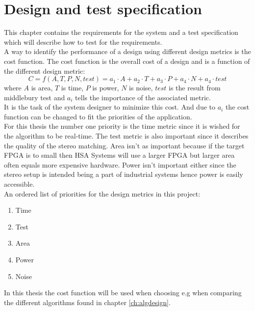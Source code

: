 \chapter{Design and test specification} \label{ch:req}
This chapter contains the requirements for the system and a test specification which will describe how to test for the requirements.\\

A way to identify the performance of a design using different design metrics is the cost function. The cost function is the overall cost of a design and is a function of the different design metric:
\begin{equation}
C = f(A,T,P,N,test) = a_1\cdot A + a_2 \cdot T + a_3 \cdot P + a_4 \cdot N + a_4 \cdot test
\end{equation}
where $A$ is area, $T$ is time, $P$ is power, $N$ is noise, $test$ is the result from middlebury test and $a_i$ tells the importance of the associated metric.\\
It is the task of the system designer to minimize this cost. And due to $a_i$ the cost function can be changed to fit the priorities of the application.\\

For this thesis the number one priority is the time metric since it is wished for the algorithm to be real-time. The test metric is also important since it describes the quality of the stereo matching. Area isn't as important because if the target FPGA is to small then HSA Systems will use a larger FPGA but larger area often equals more expensive hardware. Power isn't important either since the stereo setup is intended being a part of industrial systems hence power is easily accessible.\\
An ordered list of priorities for the design metrics in this project:
\begin{enumerate}
  \item Time
  \item Test
  \item Area
  \item Power
  \item Noise
\end{enumerate}

In this thesis the cost function will be used when choosing e.g when comparing the different algorithms found in chapter \vref{ch:algdesign}. 

